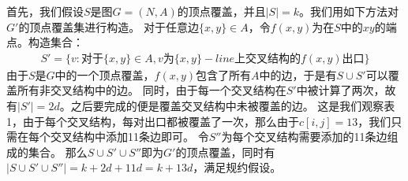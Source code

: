 \documentclass[UTF8]{ctexart}
\begin{document}
首先，我们假设$S$是图$G=(N,A)$的顶点覆盖，并且$|S|=k$。我们用如下方法对$G'$的顶点覆盖集进行构造。
对于任意边$\{x,y\} \in A$，令$f(x,y)$为在$S$中的$xy$的端点。构造集合：
\begin{gather*}
    S' = \{v: \mbox{对于}\{x,y\} \in A, v\mbox{为}\{x,y\}-line\mbox{上交叉结构的}f(x,y)\mbox{出口} \}
\end{gather*}
由于$S$是$G$中的一个顶点覆盖，$f(x,y)$包含了所有$A$中的边，于是有$S \cup S'$可以覆盖所有非交叉结构中的边。
同时，由于每一个交叉结构在$S'$中被计算了两次，故有$|S'|=2d$。之后要完成的便是覆盖交叉结构中未被覆盖的边。
这是我们观察表1，由于每个交叉结构，每对出口都被覆盖了一次，那么由于$c[i,j]=13$，我们只需在每个交叉结构中添加11条边即可。
令$S''$为每个交叉结构需要添加的11条边组成的集合。
那么$S \cup S' \cup S''$即为$G'$的顶点覆盖，同时有$|S \cup S' \cup S''|=k+2d+11d=k+13d$，满足规约假设。 \par
\end{document}
